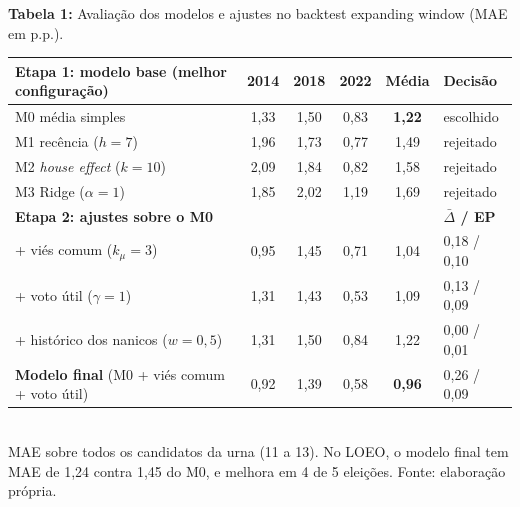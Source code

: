 \documentclass[10pt,a4paper]{article}
\begin{document}
\begin{center}\small
\textbf{Tabela 1:} Avaliação dos modelos e ajustes no backtest expanding window (MAE em p.p.).\\[2pt]
\begin{tabular}{lccccl}
\toprule
\textbf{Etapa 1: modelo base} (melhor configuração) & \textbf{2014} & \textbf{2018} & \textbf{2022} & \textbf{Média} & \textbf{Decisão} \\
\midrule
M0 média simples & 1,33 & 1,50 & 0,83 & \textbf{1,22} & escolhido \\
M1 recência ($h=7$) & 1,96 & 1,73 & 0,77 & 1,49 & rejeitado \\
M2 \emph{house effect} ($k=10$) & 2,09 & 1,84 & 0,82 & 1,58 & rejeitado \\
M3 Ridge ($\alpha=1$) & 1,85 & 2,02 & 1,19 & 1,69 & rejeitado \\
\midrule
\textbf{Etapa 2: ajustes sobre o M0} & & & & & \textbf{$\bar\Delta$ / EP} \\
\midrule
+ viés comum ($k_\mu=3$) & 0,95 & 1,45 & 0,71 & 1,04 & 0,18 / 0,10 \\
+ voto útil ($\gamma=1$) & 1,31 & 1,43 & 0,53 & 1,09 & 0,13 / 0,09 \\
+ histórico dos nanicos ($w=0{,}5$) & 1,31 & 1,50 & 0,84 & 1,22 & 0,00 / 0,01 \\
\textbf{Modelo final} (M0 + viés comum + voto útil) & 0,92 & 1,39 & 0,58 & \textbf{0,96} & 0,26 / 0,09 \\
\bottomrule
\end{tabular}\\[2pt]
{\footnotesize MAE sobre todos os candidatos da urna (11 a 13). No LOEO, o modelo final tem MAE de 1,24 contra 1,45 do M0, e melhora em 4 de 5 eleições. Fonte: elaboração própria.}
\end{center}
\end{document}
